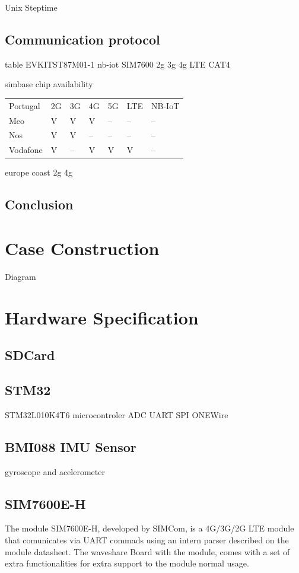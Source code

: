 Unix Steptime

\subsection{Communication protocol}

table
EVKITST87M01-1 nb-iot
SIM7600 2g 3g 4g LTE CAT4

simbase chip availability

\begin{table}
    \centering
    \begin{tabular}{lllllll}
    Portugal & 2G & 3G & 4G & 5G & LTE & NB-IoT   \\
    Meo      & V  & V  & V  & -- & --  & --       \\
    Nos      & V  & V  & -- & -- & --  & --       \\
    Vodafone & V  & -- & V  & V  & V   & -- 
    \end{tabular}
\end{table}

europe coast
2g 4g


\subsection{Conclusion}
\section{Case Construction}

Diagram

\section{Hardware Specification}
\subsection{SDCard}
\subsection{STM32}

STM32L010K4T6
microcontroler
ADC
UART
SPI
ONEWire
\subsection{BMI088 IMU Sensor}
gyroscope and acelerometer
\subsection{SIM7600E-H} 
The module SIM7600E-H, developed by SIMCom, is a 4G/3G/2G LTE module that comunicates via UART commads using an intern parser described on the module datasheet. 
The waveshare Board with the module, comes with a set of extra functionalities for extra support to the module normal usage.


